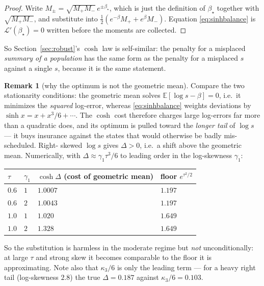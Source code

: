 \documentclass[11pt]{article}
\theoremstyle{definition}
\newtheorem{remark}[proposition]{Remark}
\newcommand{\E}{\mathbb{E}}
\begin{document}
\begin{proof}
Write $M_\pm=\sqrt{M_+M_-}\,e^{\pm\beta_\star}$, which is just the definition of
$\beta_\star$ together with $\sqrt{M_+M_-}$, and substitute into
$\tfrac12(e^{-\beta}M_++e^{\beta}M_-)$. Equation \eqref{eq:sinhbalance} is
$\mathcal L'(\beta_\star)=0$ written before the moments are collected.
\end{proof}

So Section~\ref{sec:robust}'s $\cosh$ law is self-similar: the penalty for a
misplaced \emph{summary of a population} has the same form as the penalty for a
misplaced $\hat s$ against a single $s$, because it is the same statement.

\begin{remark}[why the optimum is not the geometric mean]
\label{rem:whynotgeo}
Compare the two stationarity conditions: the geometric mean solves
$\E[\log s-\beta]=0$, i.e.\ it minimizes the \emph{squared} log-error, whereas
\eqref{eq:sinhbalance} weights deviations by $\sinh x=x+x^3/6+\cdots$. The
$\cosh$ cost therefore charges large log-errors far more than a quadratic does,
and its optimum is pulled toward the \emph{longer tail} of $\log s$ --- it buys
insurance against the states that would otherwise be badly mis-scheduled. Right-
skewed $\log s$ gives $\Delta>0$, i.e.\ a shift above the geometric mean.
Numerically, with $\Delta\approx\gamma_1\tau^3/6$ to leading order in the
log-skewness $\gamma_1$:
\begin{center}\small
\begin{tabular}{llll}
\toprule
$\tau$ & $\gamma_1$ & $\cosh\Delta$ (cost of geometric mean)
  & floor $e^{\tau^2/2}$ \\
\midrule
$0.6$ & $1$ & $1.0007$ & $1.197$ \\
$0.6$ & $2$ & $1.0043$ & $1.197$ \\
$1.0$ & $1$ & $1.020$  & $1.649$ \\
$1.0$ & $2$ & $1.328$  & $1.649$ \\
\bottomrule
\end{tabular}
\end{center}
So the substitution is harmless in the moderate regime but \emph{not}
unconditionally: at large $\tau$ and strong skew it becomes comparable to the
floor it is approximating. Note also that $\kappa_3/6$ is only the leading term
--- for a heavy right tail (log-skewness $2.8$) the true $\Delta=0.187$ against
$\kappa_3/6=0.103$.
\end{remark}
\end{document}

